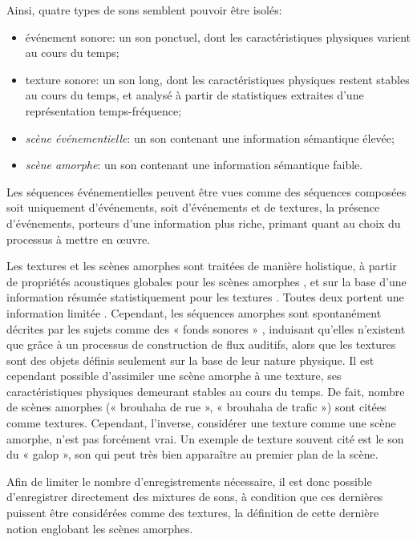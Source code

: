 Ainsi, quatre types de sons semblent pouvoir être isolés:

\begin{itemize}
\item {événement sonore}: un son ponctuel, dont les caractéristiques physiques varient au cours du temps;
\item {texture sonore}: un son long, dont les caractéristiques physiques restent stables au cours du temps, et analysé à partir de statistiques extraites d'une représentation temps-fréquence;
\item \emph{scène événementielle}: un son contenant une information sémantique élevée;
\item \emph{scène amorphe}: un son contenant une information sémantique faible.
\end{itemize}

Les séquences événementielles peuvent être vues comme des séquences composées soit uniquement d'événements, soit d'événements et de textures, la présence d'événements, porteurs d'une information plus riche, primant quant au choix du processus à mettre en œuvre.
 
Les textures et les scènes amorphes sont traitées de manière holistique, à partir de propriétés acoustiques globales pour les scènes amorphes \citep{dubois2006cognitive,maffiolo_caracterisation_1999}, et sur la base d'une information résumée statistiquement pour les textures \citep{mcdermott2013summary}. Toutes deux portent une information limitée \citep{saint1995classification,nelken2013ear}. Cependant, les séquences amorphes sont spontanément décrites par les sujets comme des « fonds sonores » \citep{maffiolo_caracterisation_1999,guastavino2006ideal}, induisant qu'elles n'existent que grâce à un processus de construction de flux auditifs, alors que les textures sont des objets définis seulement sur la base de leur nature physique. Il est cependant possible d'assimiler une scène amorphe à une texture, ses caractéristiques physiques demeurant stables au cours du temps. De fait, nombre de scènes amorphes (« brouhaha de rue », « brouhaha de trafic ») sont citées comme textures. Cependant, l'inverse, considérer une texture comme une scène amorphe, n'est pas forcément vrai.
Un exemple de texture souvent cité est le son du « galop », son qui peut très bien apparaître au premier plan de la scène.

Afin de limiter le nombre d'enregistrements nécessaire, il est donc possible d'enregistrer directement des mixtures de sons, à condition que ces dernières puissent être considérées comme des textures, la définition de cette dernière notion englobant les scènes amorphes. 

